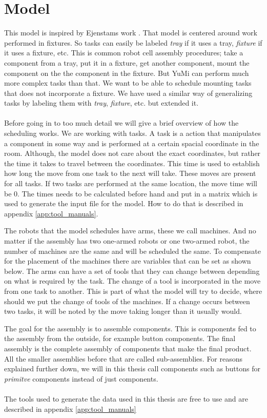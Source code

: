 \chapter{Model}\label{cha:model}

 This model is inspired by Ejenstams work \cite{ejenstam_2014}. That model is centered around work performed in fixtures. So tasks can easily be labeled \emph{tray} if it uses a tray, \emph{fixture} if it uses a fixture, etc. This is common robot cell assembly procedures; take a component from a tray, put it in a fixture, get another component, mount the component on the the component in the fixture. But YuMi can perform much more complex tasks than that. We want to be able to schedule mounting tasks that does not incorporate a fixture. We have used a similar way of generalizing tasks by labeling them with \emph{tray}, \emph{fixture}, etc. but extended it.
 \\\\
Before going in to too much detail we will give a brief overview of how the scheduling works. We are working with tasks. A task is a action that manipulates a component in some way and is performed at a certain spacial coordinate in the room. Although, the model does not care about the exact coordinates, but rather the time it takes to travel between the coordinates. This time is used to establish how long the move from one task to the next will take. These moves are present for all tasks. If two tasks are performed at the same location, the move time will be $0$. The times needs to be calculated before hand and put in a matrix which is used to generate the input file for the model. How to do that is described in appendix \ref{app:tool_manuals}.

The robots that the model schedules have arms, these we call machines. And no matter if the assembly has two one-armed robots or one two-armed robot, the number of machines are the same and will be scheduled the same. To compensate for the placement of the machines there are variables that can be set as shown below. The arms can have a set of tools that they can change between depending on what is required by the task. The change of a tool is incorporated in the move from one task to another. This is part of what the model will try to decide, where should we put the change of tools of the machines. If a change occurs between two tasks, it will be noted by the move taking longer than it usually would.

 The goal for the assembly is to assemble components. This is components fed to the assembly from the outside, for example button components. The final assembly is the complete assembly of components that make the final product. All the smaller assemblies before that are called sub-assemblies. For reasons explained further down, we will in this thesis call components such as buttons for \emph{primitve} components instead of just components.
\\\\
The tools used to generate the data used in this thesis are free to use and are described in appendix \ref{app:tool_manuals}
 
